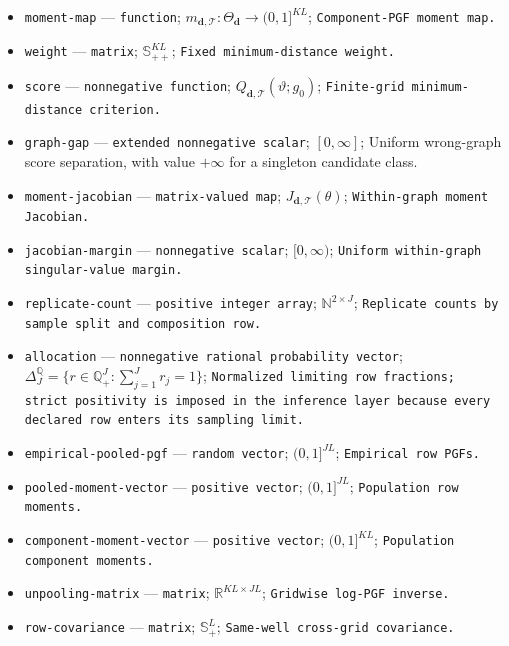 \documentclass{article}
\begin{document}
\begin{itemize}
  \item \texttt{moment-\allowbreak{}map} --- \texttt{function}; \(m_{\boldsymbol d,\mathcal T}:\Theta_{\boldsymbol d}\to(0,1]^{KL}\); \texttt{Component-\allowbreak{}PGF moment map.}
  \item \texttt{weight} --- \texttt{matrix}; \(\mathbb S_{++}^{KL}\); \texttt{Fixed minimum-\allowbreak{}distance weight.}
  \item \texttt{score} --- \texttt{nonnegative function}; \(Q_{\boldsymbol d,\mathcal T}(\vartheta;g_0)\); \texttt{Finite-\allowbreak{}grid minimum-\allowbreak{}distance criterion.}
  \item \texttt{graph-\allowbreak{}gap} --- \texttt{extended nonnegative scalar}; \([0,\infty]\); Uniform wrong-graph score separation, with value \(+\infty\) for a singleton candidate class.
  \item \texttt{moment-\allowbreak{}jacobian} --- \texttt{matrix-\allowbreak{}valued map}; \(J_{\boldsymbol d,\mathcal T}(\theta)\); \texttt{Within-\allowbreak{}graph moment Jacobian.}
  \item \texttt{jacobian-\allowbreak{}margin} --- \texttt{nonnegative scalar}; \([0,\infty)\); \texttt{Uniform within-\allowbreak{}graph singular-\allowbreak{}value margin.}
  \item \texttt{replicate-\allowbreak{}count} --- \texttt{positive integer array}; \(\mathbb N^{2\times J}\); \texttt{Replicate counts by sample split and composition row.}
  \item \texttt{allocation} --- \texttt{nonnegative rational probability vector}; \(\Delta_J^{\mathbb Q}=\{r\in\mathbb Q_+^J:\sum_{j=1}^{J}r_j=1\}\); \texttt{Normalized limiting row fractions;\allowbreak{} strict positivity is imposed in the inference layer because every declared row enters its sampling limit.}
  \item \texttt{empirical-\allowbreak{}pooled-\allowbreak{}pgf} --- \texttt{random vector}; \((0,1]^{JL}\); \texttt{Empirical row PGFs.}
  \item \texttt{pooled-\allowbreak{}moment-\allowbreak{}vector} --- \texttt{positive vector}; \((0,1]^{JL}\); \texttt{Population row moments.}
  \item \texttt{component-\allowbreak{}moment-\allowbreak{}vector} --- \texttt{positive vector}; \((0,1]^{KL}\); \texttt{Population component moments.}
  \item \texttt{unpooling-\allowbreak{}matrix} --- \texttt{matrix}; \(\mathbb R^{KL\times JL}\); \texttt{Gridwise log-\allowbreak{}PGF inverse.}
  \item \texttt{row-\allowbreak{}covariance} --- \texttt{matrix}; \(\mathbb S_+^L\); \texttt{Same-\allowbreak{}well cross-\allowbreak{}grid covariance.}

\end{itemize}
\end{document}
